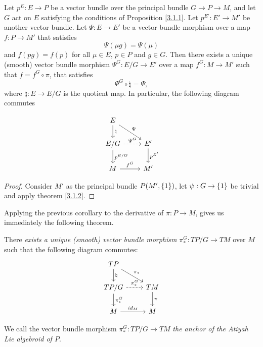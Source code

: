 \begin{corollary}
Let $p^E: E \to P$ be a vector bundle over the principal bundle $G \to P \to M$, and let $G$ act on $E$ satisfying the conditions of Proposition \ref{3.1.1}. Let $p^{E'}:E' \to M'$ be another vector bundle. Let $\Psi: E \to E'$ be a vector bundle morphism over a map $f: P \to M'$ that satisfies \[\Psi(\mu g) = \Psi(\mu)\] and $f(pg) = f(p)$ for all $\mu \in E$, $p \in P$ and $g \in G$. Then there exists a unique (smooth) vector bundle morphism $\Psi^{G}: E/G \to E'$ over a map $f^{G}: M \to M'$ such that $f = f^{G} \circ \pi$, that satisfies \[\Psi^{G} \circ \natural = \Psi,\] where $\natural: E \to E/G$ is the quotient map. In particular, the following diagram commutes

\begin{equation} \label{anchorDiagram}
    \begin{tikzcd}
    E \arrow[]{d}{\natural} \arrow[]{dr}{\Psi}& \\
    E/G \arrow[dashed]{r}{\Psi^{G}} \arrow[]{d}{p^{E/G}}& E' \arrow[]{d}{p^{E'}} \\
    M \arrow[]{r}{f^{G}} & M'
    \end{tikzcd}
\end{equation}
\end{corollary}

\begin{proof}
Consider $M'$ as the principal bundle $P(M', \left\{ 1 \right\})$, let $\psi:G \to \left\{ 1 \right\}$ be trivial and apply theorem \ref{3.1.2}.
\end{proof}

Applying the previous corollary to the derivative of $\pi: P \to M$, gives us immediately the following theorem.

\begin{theorem}\label{anchorAtiyah}
There \emph{exists a unique (smooth) vector bundle morphism} $\pi_*^G: TP/G \to TM$ over $M$ such that the following diagram commutes:
\begin{equation} \label{anchorDiagram}
    \begin{tikzcd}
    TP \arrow[]{d}{\natural} \arrow[]{dr}{\pi_*}& \\
    TP/G \arrow[dashed]{r}{\pi^G_*} \arrow[]{d}{\pi_*^G}& TM \arrow[]{d}{\pi} \\
    M \arrow[]{r}{id_M} & M
    \end{tikzcd}
\end{equation}

We call the vector bundle morphism $\pi^G_*:TP/G \to TM$ \emph{the anchor of the Atiyah Lie algebroid of $P$}.
\end{theorem}

